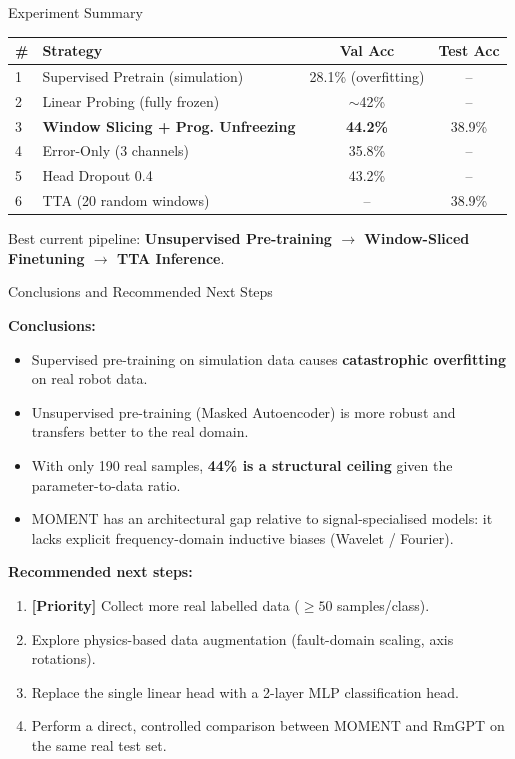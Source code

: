 \documentclass{beamer}
\begin{document}
\begin{frame}{Experiment Summary}

    \begin{table}[]
        \centering
        \begin{tabular}{@{}llcc@{}}
            \toprule
            \textbf{\#} & \textbf{Strategy} & \textbf{Val Acc} & \textbf{Test Acc} \\
            \midrule
            1 & Supervised Pretrain (simulation) & 28.1\% (overfitting) & -- \\
            2 & Linear Probing (fully frozen) & $\sim$42\% & -- \\
            3 & \textbf{Window Slicing + Prog. Unfreezing} & \textbf{44.2\%} & 38.9\% \\
            4 & Error-Only (3 channels) & 35.8\% & -- \\
            5 & Head Dropout 0.4 & 43.2\% & -- \\
            6 & TTA (20 random windows) & -- & 38.9\% \\
            \bottomrule
        \end{tabular}
    \end{table}

    \vspace{0.2cm}
    Best current pipeline: \textbf{Unsupervised Pre-training $\rightarrow$ Window-Sliced Finetuning $\rightarrow$ TTA Inference}.
\end{frame}

\begin{frame}{Conclusions and Recommended Next Steps}

    \textbf{Conclusions:}
    \begin{itemize}
        \item[\checkmark] Supervised pre-training on simulation data causes \textbf{catastrophic overfitting} on real robot data.
        \item[\checkmark] Unsupervised pre-training (Masked Autoencoder) is more robust and transfers better to the real domain.
        \item[\checkmark] With only 190 real samples, \textbf{44\% is a structural ceiling} given the parameter-to-data ratio.
        \item[\checkmark] MOMENT has an architectural gap relative to signal-specialised models: it lacks explicit frequency-domain inductive biases (Wavelet / Fourier).
    \end{itemize}

    \vspace{0.3cm}
    \textbf{Recommended next steps:}
    \begin{enumerate}
        \item \textbf{[Priority]} Collect more real labelled data ($\geq 50$ samples/class).
        \item Explore physics-based data augmentation (fault-domain scaling, axis rotations).
        \item Replace the single linear head with a 2-layer MLP classification head.
        \item Perform a direct, controlled comparison between MOMENT and RmGPT on the same real test set.
    \end{enumerate}
\end{frame}
\end{document}
